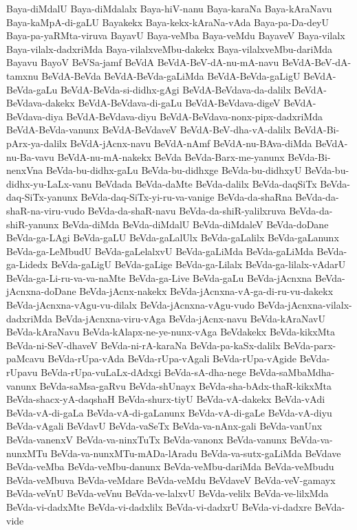 {Baya-diMdalU
Baya-diMdalalx
Baya-hiV-nanu
Baya-karaNa
Baya-kAraNavu
Baya-kaMpA-di-gaLU
Bayakekx
Baya-kekx-kAraNa-vAda
Baya-pa-Da-deyU
Baya-pa-yaRMta-viruva
BayavU
Baya-veMba
Baya-veMdu
BayaveV
Baya-vilalx
Baya-vilalx-dadxriMda
Baya-vilalxveMbu-dakekx
Baya-vilalxveMbu-dariMda
Bayavu
BayoV
BeVSa-jamf
BeVdA
BeVdA-BeV-dA-nu-mA-navu
BeVdA-BeV-dA-tamxnu
BeVdA-BeVda
BeVdA-BeVda-gaLiMda
BeVdA-BeVda-gaLigU
BeVdA-BeVda-gaLu
BeVdA-BeVda-si-didhx-gAgi
BeVdA-BeVdava-da-dalilx
BeVdA-BeVdava-dakekx
BeVdA-BeVdava-di-gaLu
BeVdA-BeVdava-digeV
BeVdA-BeVdava-diya
BeVdA-BeVdava-diyu
BeVdA-BeVdava-nonx-pipx-dadxriMda
BeVdA-BeVda-vanunx
BeVdA-BeVdaveV
BeVdA-BeV-dha-vA-dalilx
BeVdA-Bi-pArx-ya-dalilx
BeVdA-jAcnx-navu
BeVdA-nAmf
BeVdA-nu-BAva-diMda
BeVdA-nu-Ba-vavu
BeVdA-nu-mA-nakekx
BeVda
BeVda-Barx-me-yanunx
BeVda-Bi-nenxVna
BeVda-bu-didhx-gaLu
BeVda-bu-didhxge
BeVda-bu-didhxyU
BeVda-bu-didhx-yu-LaLx-vanu
BeVdada
BeVda-daMte
BeVda-dalilx
BeVda-daqSiTx
BeVda-daq-SiTx-yanunx
BeVda-daq-SiTx-yi-ru-va-vanige
BeVda-da-shaRna
BeVda-da-shaR-na-viru-vudo
BeVda-da-shaR-navu
BeVda-da-shiR-yalilxruva
BeVda-da-shiR-yanunx
BeVda-diMda
BeVda-diMdalU
BeVda-diMdaleV
BeVda-doDane
BeVda-ga-LAgi
BeVda-gaLU
BeVda-gaLalUlx
BeVda-gaLalilx
BeVda-gaLanunx
BeVda-ga-LeMbudU
BeVda-gaLelalxvU
BeVda-gaLiMda
BeVda-gaLiMda
BeVda-ga-Lidedx
BeVda-gaLigU
BeVda-gaLige
BeVda-ga-Lilalx
BeVda-ga-lilalx-vAdarU
BeVda-ga-Li-ru-va-va-naMte
BeVda-ga-Live
BeVda-gaLu
BeVda-jAcnxna
BeVda-jAcnxna-doDane
BeVda-jAcnx-nakekx
BeVda-jAcnxna-vA-ga-di-ru-vu-dakekx
BeVda-jAcnxna-vAgu-vu-dilalx
BeVda-jAcnxna-vAgu-vudo
BeVda-jAcnxna-vilalx-dadxriMda
BeVda-jAcnxna-viru-vAga
BeVda-jAcnx-navu
BeVda-kAraNavU
BeVda-kAraNavu
BeVda-kAlapx-ne-ye-nunx-vAga
BeVdakekx
BeVda-kikxMta
BeVda-ni-SeV-dhaveV
BeVda-ni-rA-karaNa
BeVda-pa-kaSx-dalilx
BeVda-parx-paMcavu
BeVda-rUpa-vAda
BeVda-rUpa-vAgali
BeVda-rUpa-vAgide
BeVda-rUpavu
BeVda-rUpa-vuLaLx-dAdxgi
BeVda-sA-dha-nege
BeVda-saMbaMdha-vanunx
BeVda-saMsa-gaRvu
BeVda-shUnayx
BeVda-sha-bAdx-thaR-kikxMta
BeVda-shacx-yA-daqshaH
BeVda-shurx-tiyU
BeVda-vA-dakekx
BeVda-vAdi
BeVda-vA-di-gaLa
BeVda-vA-di-gaLanunx
BeVda-vA-di-gaLe
BeVda-vA-diyu
BeVda-vAgali
BeVdavU
BeVda-vaSeTx
BeVda-va-nAnx-gali
BeVda-vanUnx
BeVda-vanenxV
BeVda-va-ninxTuTx
BeVda-vanonx
BeVda-vanunx
BeVda-va-nunxMTu
BeVda-va-nunxMTu-mADa-lAradu
BeVda-va-sutx-gaLiMda
BeVdave
BeVda-veMba
BeVda-veMbu-danunx
BeVda-veMbu-dariMda
BeVda-veMbudu
BeVda-veMbuva
BeVda-veMdare
BeVda-veMdu
BeVdaveV
BeVda-veV-gamayx
BeVda-veVnU
BeVda-veVnu
BeVda-ve-lalxvU
BeVda-velilx
BeVda-ve-lilxMda
BeVda-vi-dadxMte
BeVda-vi-dadxlilx
BeVda-vi-dadxrU
BeVda-vi-dadxre
BeVda-vide
}
